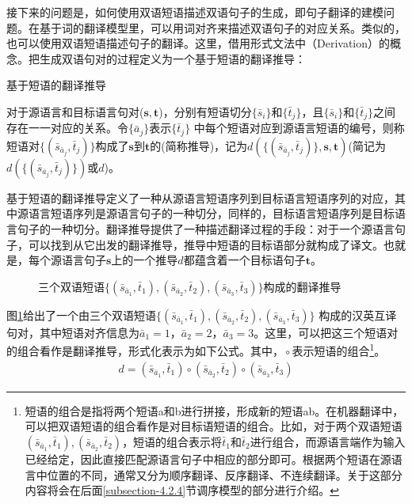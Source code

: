 \parinterval 接下来的问题是，如何使用双语短语描述双语句子的生成，即句子翻译的建模问题。在基于词的翻译模型里，可以用词对齐来描述双语句子的对应关系。类似的，也可以使用双语短语描述句子的翻译。这里，借用形式文法中{\small{}}（Derivation）的概念。把生成双语句对的过程定义为一个基于短语的翻译推导：

\vspace{0.5em}
\begin{definition} 基于短语的翻译推导

{\small
对于源语言和目标语言句对($\mathbf{s}, \mathbf{t}$)，分别有短语切分$\{\bar{s}_i\}$和$\{\bar{t}_j\}$，且$\{\bar{s}_i\}$和$\{\bar{t}_j\}$之间存在一一对应的关系。令$\{\bar{a}_j\}$表示$\{\bar{t}_j\}$ 中每个短语对应到源语言短语的编号，则称短语对$\{(\bar{s}_{\bar{a}_j},\bar{t}_j)\}$构成了$\mathbf{s}$到$\mathbf{t}$的{\small{}}(简称推导)，记为$d(\{(\bar{s}_{\bar{a}_j},\bar{t}_j)\},\mathbf{s},\mathbf{t})$(简记为$d(\{(\bar{s}_{\bar{a}_j},\bar{t}_j)\})$或$d$)。
}
\end{definition}

\parinterval 基于短语的翻译推导定义了一种从源语言短语序列到目标语言短语序列的对应，其中源语言短语序列是源语言句子的一种切分，同样的，目标语言短语序列是目标语言句子的一种切分。翻译推导提供了一种描述翻译过程的手段：对于一个源语言句子，可以找到从它出发的翻译推导，推导中短语的目标语部分就构成了译文。也就是，每个源语言句子$\mathbf{s}$上的一个推导$d$都蕴含着一个目标语句子$\mathbf{t}$。

\begin{figure}[htp]
\centering

\caption{三个双语短语$\{(\bar{s}_{\bar{a}_1},\bar{t}_1),(\bar{s}_{\bar{a}_2},\bar{t}_2),(\bar{s}_{\bar{a}_3},\bar{t}_3)\}$构成的翻译推导}
\label{fig:4-10}
\end{figure}

\parinterval 图\ref{fig:4-10}给出了一个由三个双语短语$\{(\bar{s}_{\bar{a}_1},\bar{t}_1),(\bar{s}_{\bar{a}_2},\bar{t}_2),(\bar{s}_{\bar{a}_3},\bar{t}_3)\}$ 构成的汉英互译句对，其中短语对齐信息为$\bar{a}_1 = 1$，$\bar{a}_2 = 2$，$\bar{a}_3 = 3$。这里，可以把这三个短语对的组合看作是翻译推导，形式化表示为如下公式。其中，${} \circ $表示短语的组合\footnote[2]{短语的组合是指将两个短语a和b进行拼接，形成新的短语ab。在机器翻译中，可以把双语短语的组合看作是对目标语短语的组合。比如，对于两个双语短语$(\bar{s}_{\bar{a}_1},\bar{t}_1),(\bar{s}_{\bar{a}_2},\bar{t}_2)$，短语的组合表示将$\bar{t}_1$和$\bar{t}_2$进行组合，而源语言端作为输入已经给定，因此直接匹配源语言句子中相应的部分即可。根据两个短语在源语言中位置的不同，通常又分为顺序翻译、反序翻译、不连续翻译。关于这部分内容将会在后面\ref{subsection-4.2.4}节调序模型的部分进行介绍。}。
\begin{eqnarray}
d = {(\bar{s}_{\bar{a}_1},\bar{t}_1)} \circ {(\bar{s}_{\bar{a}_2},\bar{t}_2)} \circ {(\bar{s}_{\bar{a}_3},\bar{t}_3)}
\label{eq:4-1}
\end{eqnarray}

